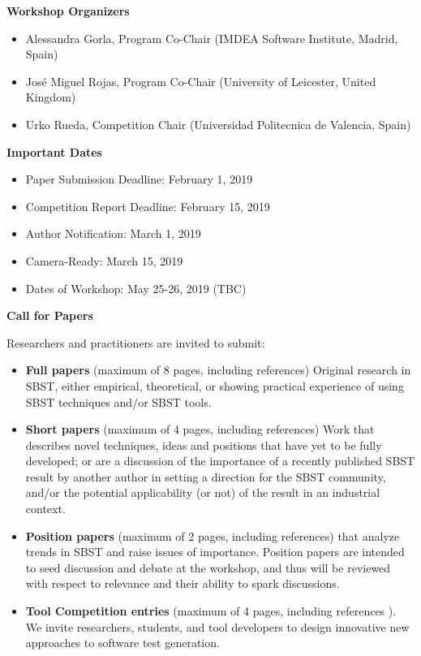 \documentclass[10pt,conference]{IEEEtran}
\begin{document}
\smallskip\noindent\textbf{Workshop Organizers}
\begin{itemize}
\setlength{\itemsep}{1pt}
  \setlength{\parskip}{0pt}
  \setlength{\parsep}{0pt}
\item{Alessandra Gorla, Program Co-Chair \newline 
    (IMDEA Software Institute, Madrid, Spain)}
  \item{Jos{\'e} Miguel Rojas, Program Co-Chair \newline 
(University of Leicester, United Kingdom)}
\item{Urko Rueda, Competition Chair \newline
(Universidad Politecnica de Valencia, Spain)}
\end{itemize}

\smallskip\noindent\textbf{Important Dates}
\begin{itemize}
\setlength{\itemsep}{1pt}
  \setlength{\parskip}{0pt}
  \setlength{\parsep}{0pt}
\item{Paper Submission Deadline: February 1, 2019}
\item{Competition Report Deadline: February 15, 2019}
\item{Author Notification: March 1, 2019}
\item{Camera-Ready: March 15, 2019}
\item{Dates of Workshop: May 25-26, 2019 (TBC)}
\end{itemize}

\smallskip\noindent\textbf{Call for Papers}

\noindent Researchers and practitioners are invited to submit:
\begin{itemize}
\setlength{\itemsep}{1pt}
  \setlength{\parskip}{0pt}
  \setlength{\parsep}{0pt}
\item \textbf{Full papers} (maximum of 8 pages, including references)
  Original research in SBST, either empirical, theoretical, or
  showing practical experience of using SBST techniques and/or SBST
  tools.
  \item \textbf{Short papers} (maximum of 4 pages, including
    references) Work that describes novel techniques, ideas and
    positions that have yet to be fully developed; or are a discussion
    of the importance of a recently published SBST result by another
    author in setting a direction for the SBST community, and/or the
    potential applicability (or not) of the result in an industrial
    context.
  \item \textbf{Position papers} (maximum of 2 pages, including
    references) that analyze trends in SBST and raise issues of
    importance. Position papers are intended to seed discussion and
    debate at the workshop, and thus will be reviewed with respect to
    relevance and their ability to spark discussions.
  \item \textbf{Tool Competition entries} (maximum of 4 pages,
    including references
    ). We invite researchers, students, and tool
    developers to design innovative new approaches to software test
    generation.
\end{itemize}
\end{document}
